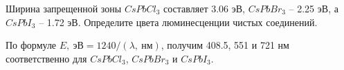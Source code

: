 
Ширина запрещенной зоны $CsPbCl_3$ составляет 3.06 эВ, $CsPbBr_3$ – 2.25 эВ, а $CsPbI_3$ – 1.72 эВ. Определите цвета люминесценции чистых соединений.

\explanationSection

По формуле $E, \: \text{эВ}=  1240/(\lambda, \: \text{нм})$, получим 408.5, 551 и 721 нм соответственно для $CsPbCl_3$, $CsPbBr_3$ и $CsPbI_3$.
